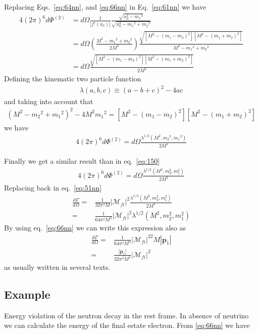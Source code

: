 Replacing Eqs.~\eqref{eq:64nn}, and \eqref{eq:66nn} in Eq.~\eqref{eq:61nn}
we have
\begin{align}
  \label{eq:67nn}
4(2\pi)^6d\Phi^{(2)}&=d\Omega\frac{1}{|f'(x_0)|}
\frac{\sqrt{x_0^2-{m_1}^2}}{\sqrt{x_0^2-{m_1}^2+{m_2}^2}}\nonumber\\
  &=d\Omega\left(\frac{M^2-{m_1}^2+{m_2}^2}{2M^2}\right)
\frac{\sqrt{[M^2-({m_1}-{m_2})^2][M^2-({m_1}+{m_2})^2]}}{M^2-{m_1}^2+{m_2}^2}\nonumber\\
&=d\Omega\frac{\sqrt{[M^2-({m_1}-{m_2})^2][M^2-({m_1}+{m_2})^2]}}{2M^2}
\end{align}
Defining the kinematic two particle function
\begin{align}
  \label{eq:46}
  \lambda(a,b,c)\equiv(a-b+c)^2-4ac
\end{align}
and taking into account that
\begin{align}
  \left(M^2-{m_2}^2+{m_1}^2\right)^2-4M^2{m_1}^2=[M^2-({m_1}-{m_2})^2][M^2-({m_1}+{m_2})^2]
\end{align}
we have
\begin{align}
\label{eq:150nn}
4(2\pi)^6d\Phi^{(2)}=d\Omega\frac{\lambda^{1/2}(M^2,{m_2}^2,{m_1}^2)}{2M^2}
\end{align}


Finally  we get a similar result than in eq.~\eqref{eq:150}
\begin{align}
    4(2\pi)^6d\Phi^{(2)}=d\Omega\frac{\lambda^{1/2}(M^2,m_2^2,m_1^2)}{2M^2}
\end{align}
Replacing back in eq.~\eqref{eq:51nn}
\begin{align}
\label{eq:152}
\frac{d\Gamma}{d\Omega}=&\frac{1}{32 \pi^2M}\left|\mathcal{M}_{fi}\right|^2\frac{\lambda^{1/2}(M^2,m_2^2,m_1^2)}{2M^2}\nonumber\\
=&\frac{1}{64 \pi^2M^3}\left|\mathcal{M}_{fi}\right|^2\lambda^{1/2}(M^2,m_2^2,m_1^2) 
\end{align}
By using eq.~\eqref{eq:66nn} we can write this expression also as
\begin{align}
\frac{d\Gamma}{d\Omega}
=&\frac{1}{64 \pi^2M^3}\left|\mathcal{M}_{fi}\right|^22M|\mathbf{p}_1|\nonumber\\
=&\frac{|\mathbf{p}_1|}{32 \pi^2M^2}\left|\mathcal{M}_{fi}\right|^2
\end{align}
as usually written in several texts.

\subsection{Example}
Energy violation of the neutron decay in the rest frame. In absence of neutrino we can calculate the energy of the final estate electron. From \eqref{eq:66nn} we have

